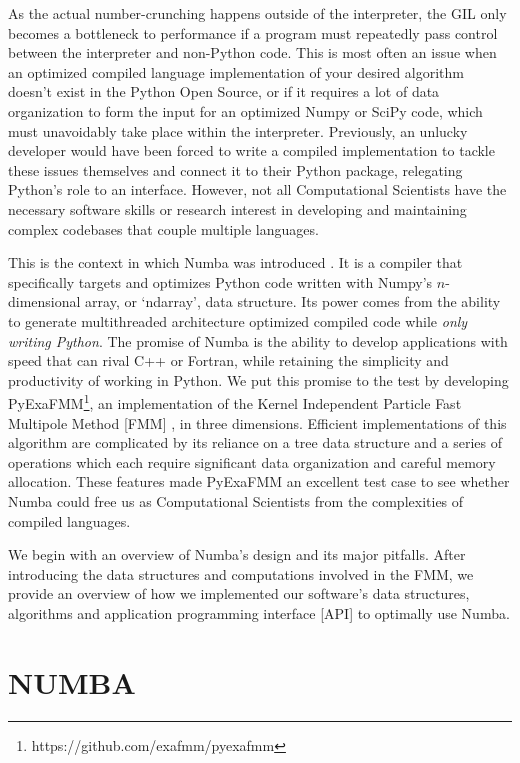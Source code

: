 \documentclass{IEEEcsmag}
\begin{document}
As the actual number-crunching happens outside of the interpreter, the GIL only becomes a bottleneck to performance if a program must repeatedly pass control between the interpreter and non-Python code. This is most often an issue when an optimized compiled language implementation of your desired algorithm doesn't exist in the Python Open Source, or if it requires a lot of data organization to form the input for an optimized Numpy or SciPy code, which must unavoidably take place within the interpreter. Previously, an unlucky developer would have been forced to write a compiled implementation to tackle these issues themselves and connect it to their Python package, relegating Python's role to an interface. However, not all Computational Scientists have the necessary software skills or research interest in developing and maintaining complex codebases that couple multiple languages.

This is the context in which Numba was introduced \cite{Lam2015}. It is a compiler that specifically targets and optimizes Python code written with Numpy's $n$-dimensional array, or `ndarray', data structure. Its power comes from the ability to generate multithreaded architecture optimized compiled code while \textit{only writing Python}. The promise of Numba is the ability to develop applications with speed that can rival C++ or Fortran, while retaining the simplicity and productivity of working in Python. We put this promise to the test by developing PyExaFMM\footnote{https://github.com/exafmm/pyexafmm}, an implementation of the Kernel Independent Particle Fast Multipole Method [FMM] \cite{Ying2004,Greengard1987}, in three dimensions. Efficient implementations of this algorithm are complicated by its reliance on a tree data structure and a series of operations which each require significant data organization and careful memory allocation. These features made PyExaFMM an excellent test case to see whether Numba could free us as Computational Scientists from the complexities of compiled languages.

We begin with an overview of Numba's design and its major pitfalls. After introducing the data structures and computations involved in the FMM, we provide an overview of how we implemented our software's data structures, algorithms and application programming interface [API] to optimally use Numba.

\section{NUMBA}
\end{document}
